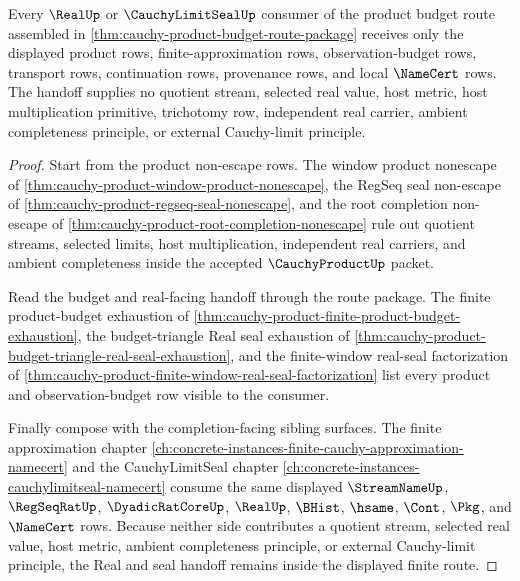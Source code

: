 \begin{theorem}
\label{thm:cauchy-product-real-handoff-nonescape}
Every $\RealUp$ or $\CauchyLimitSealUp$ consumer of the product budget route assembled in \autoref{thm:cauchy-product-budget-route-package} receives only the displayed product rows, finite-approximation rows, observation-budget rows, transport rows, continuation rows, provenance rows, and local $\NameCert$ rows. The handoff supplies no quotient stream, selected real value, host metric, host multiplication primitive, trichotomy row, independent real carrier, ambient completeness principle, or external Cauchy-limit principle.
\end{theorem}
\begin{proof}
Start from the product non-escape rows. The window product nonescape of \autoref{thm:cauchy-product-window-product-nonescape}, the RegSeq seal non-escape of \autoref{thm:cauchy-product-regseq-seal-nonescape}, and the root completion non-escape of \autoref{thm:cauchy-product-root-completion-nonescape} rule out quotient streams, selected limits, host multiplication, independent real carriers, and ambient completeness inside the accepted $\CauchyProductUp$ packet.

Read the budget and real-facing handoff through the route package. The finite product-budget exhaustion of \autoref{thm:cauchy-product-finite-product-budget-exhaustion}, the budget-triangle Real seal exhaustion of \autoref{thm:cauchy-product-budget-triangle-real-seal-exhaustion}, and the finite-window real-seal factorization of \autoref{thm:cauchy-product-finite-window-real-seal-factorization} list every product and observation-budget row visible to the consumer.

Finally compose with the completion-facing sibling surfaces. The finite approximation chapter \autoref{ch:concrete-instances-finite-cauchy-approximation-namecert} and the CauchyLimitSeal chapter \autoref{ch:concrete-instances-cauchylimitseal-namecert} consume the same displayed $\StreamNameUp$, $\RegSeqRatUp$, $\DyadicRatCoreUp$, $\RealUp$, $\BHist$, $\hsame$, $\Cont$, $\Pkg$, and $\NameCert$ rows. Because neither side contributes a quotient stream, selected real value, host metric, ambient completeness principle, or external Cauchy-limit principle, the Real and seal handoff remains inside the displayed finite route.
\end{proof}

